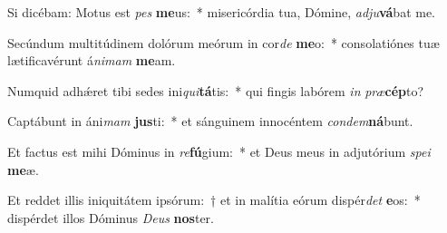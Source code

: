 \item Si dicébam: Motus est \textit{pes} \textbf{me}us:~* misericórdia tua, Dómine, \textit{ad}\textit{ju}\textbf{vá}bat me.
\item Secúndum multitúdinem dolórum meórum in cor\textit{de} \textbf{me}o:~* consolatiónes tuæ lætificavérunt á\textit{ni}\textit{mam} \textbf{me}am.
\item Numquid adhǽret tibi sedes ini\textit{qui}\textbf{tá}tis:~* qui fingis labórem \textit{in} \textit{præ}\textbf{cép}to?
\item Captábunt in áni\textit{mam} \textbf{jus}ti:~* et sánguinem innocéntem \textit{con}\textit{dem}\textbf{ná}bunt.
\item Et factus est mihi Dóminus in \textit{re}\textbf{fú}gium:~* et Deus meus in adjutórium \textit{spe}\textit{i} \textbf{me}æ.
\item Et reddet illis iniquitátem ipsórum:~† et in malítia eórum dispér\textit{det} \textbf{e}os:~* dispérdet illos Dóminus \textit{De}\textit{us} \textbf{nos}ter.
